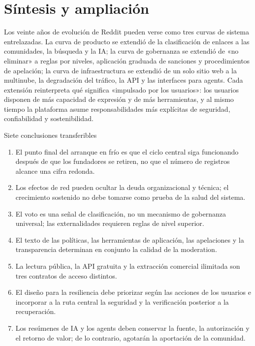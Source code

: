 \section{Síntesis y ampliación}

Los veinte años de evolución de Reddit pueden verse como tres curvas de sistema entrelazadas. La curva de producto se extendió de la clasificación de enlaces a las comunidades, la búsqueda y la IA; la curva de gobernanza se extendió de «no eliminar» a reglas por niveles, aplicación graduada de sanciones y procedimientos de apelación; la curva de infraestructura se extendió de un solo sitio web a la multinube, la degradación del tráfico, la API y las interfaces para agents. Cada extensión reinterpreta qué significa «impulsado por los usuarios»: los usuarios disponen de más capacidad de expresión y de más herramientas, y al mismo tiempo la plataforma asume responsabilidades más explícitas de seguridad, confiabilidad y sostenibilidad.

\begin{importantbox}{Siete conclusiones transferibles}
\begin{enumerate}
  \item El punto final del arranque en frío es que el ciclo central siga funcionando después de que los fundadores se retiren, no que el número de registros alcance una cifra redonda.
  \item Los efectos de red pueden ocultar la deuda organizacional y técnica; el crecimiento sostenido no debe tomarse como prueba de la salud del sistema.
  \item El voto es una señal de clasificación, no un mecanismo de gobernanza universal; las externalidades requieren reglas de nivel superior.
  \item El texto de las políticas, las herramientas de aplicación, las apelaciones y la transparencia determinan en conjunto la calidad de la moderation.
  \item La lectura pública, la API gratuita y la extracción comercial ilimitada son tres contratos de acceso distintos.
  \item El diseño para la resiliencia debe priorizar según las acciones de los usuarios e incorporar a la ruta central la seguridad y la verificación posterior a la recuperación.
  \item Los resúmenes de IA y los agents deben conservar la fuente, la autorización y el retorno de valor; de lo contrario, agotarán la aportación de la comunidad.
\end{enumerate}
\end{importantbox}

